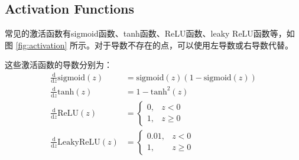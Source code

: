 \subsection{Activation Functions}

常见的激活函数有sigmoid函数、tanh函数、ReLU函数、leaky ReLU函数等，如图 \ref{fig:activation} 所示。对于导数不存在的点，可以使用左导数或右导数代替。

\begin{figure*}[h!bt]
    \centering

    \centering
    \caption{Activation Functions 激活函数}
    \label{fig:activation}
\end{figure*}

这些激活函数的导数分别为：
\begin{equation}
    \begin{aligned}
        \frac{\mathrm{d}}{\mathrm{d}z}\mathrm{sigmoid}(z) &= \mathrm{sigmoid}(z)\left(1-\mathrm{sigmoid}(z)\right) \\
        \frac{\mathrm{d}}{\mathrm{d}z}\mathrm{tanh}(z) &= 1 - \mathrm{tanh}^2(z) \\
        \frac{\mathrm{d}}{\mathrm{d}z}\mathrm{ReLU}(z) &= 
            \begin{cases}
                0, &z < 0 \\
                1, &z \geqslant 0
            \end{cases}\\
        \frac{\mathrm{d}}{\mathrm{d}z}\mathrm{LeakyReLU}(z) &= 
            \begin{cases}
                0.01, &z < 0 \\
                1, &z \geqslant 0
            \end{cases}
    \end{aligned}
\end{equation}

